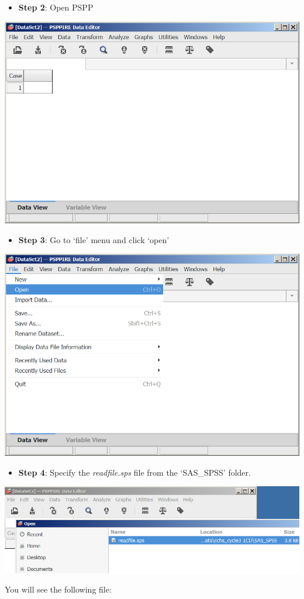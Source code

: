 \documentclass[
]{book}
\providecommand{\tightlist}{%
  \setlength{\itemsep}{0pt}\setlength{\parskip}{0pt}}
\begin{document}
\begin{itemize}
\tightlist
\item
  \textbf{Step 2}: Open PSPP
\end{itemize}

\includegraphics[width=0.65\linewidth]{images/abacus31}

\begin{itemize}
\tightlist
\item
  \textbf{Step 3}: Go to `file' menu and click `open'
\end{itemize}

\includegraphics[width=0.65\linewidth]{images/abacus32}

\begin{itemize}
\tightlist
\item
  \textbf{Step 4}: Specify the \emph{readfile.sps} file from the `SAS\_SPSS' folder.
\end{itemize}

\includegraphics[width=0.65\linewidth]{images/abacus33}

You will see the following file:
\end{document}
